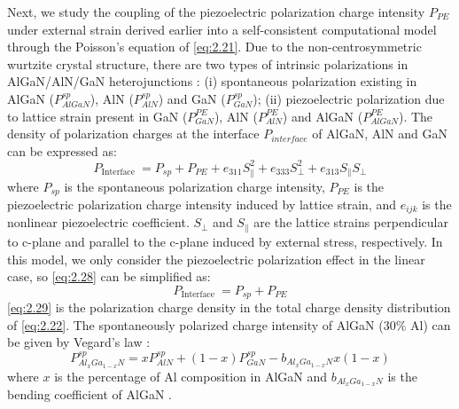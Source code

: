Next, we study the coupling of the  piezoelectric polarization charge intensity $P_{PE}$ under external  strain derived earlier into a self-consistent computational model  through the Poisson's equation  of \autoref{eq:2.21}. Due to the non-centrosymmetric wurtzite  crystal  structure, there are two types of intrinsic polarizations in  AlGaN/AlN/GaN heterojunctions \cite{ambacher1999two-b}: (i) spontaneous polarization  existing in AlGaN ($P_{AlGaN}^{sp}$), AlN ($P_{AlN}^{sp}$) and GaN ($P_{GaN}^{sp}$); (ii) piezoelectric polarization  due to lattice strain present in GaN ($P_{GaN}^{PE}$), AlN ($P_{AlN}^{PE}$) and AlGaN ($P_{AlGaN}^{PE}$). The density of polarization charges  at the  interface $P_{interface}$ of AlGaN, AlN and GaN can be expressed as:
\begin{equation}
P_{\text {Interface }}=P_{s p}+P_{P E}+e_{311} S_{\|}^{2}+e_{333} S_{\perp}^{2}+e_{313} S_{\|} S_{\perp}
\label{eq:2.28}
\end{equation}
where $P_{s p}$ is the spontaneous polarization charge intensity, $P_{P E}$ is the piezoelectric polarization charge intensity  induced by  lattice strain, and $e_{ijk}$ is the nonlinear  piezoelectric coefficient. $S_{\perp}$ and $S_{\|}$ are the lattice strains perpendicular to c-plane and parallel to the c-plane induced by external stress, respectively. In this model, we only consider the piezoelectric polarization  effect in the linear case, so \autoref{eq:2.28} can be simplified as:
\begin{equation}
P_{\text {Interface }}=P_{s p}+P_{P E}
\label{eq:2.29}
\end{equation}
\autoref{eq:2.29} is the polarization charge density in the total charge density distribution of \autoref{eq:2.22}. The spontaneously polarized charge intensity of AlGaN (30$\%$ Al) can be given by  Vegard's law \cite{vegard1921konstitution,denton1991vegard}:
\begin{equation}
P_{A l_{x} G a_{1-x} N}^{s p}=x P_{A l N}^{s p}+(1-x) P_{G a N}^{s p}-b_{A l_{x} G a_{1-x} N} x(1-x)
\label{eq:2.30}
\end{equation}
where $x$ is the percentage of Al composition in AlGaN and $b_{A l_{x} G a_{1-x} N}$ is the bending coefficient of AlGaN \cite{morkoc2008polarization}.

